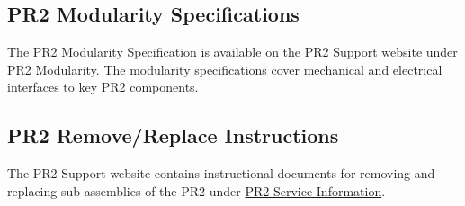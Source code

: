 \subsection{PR2 Modularity Specifications}

The PR2 Modularity Specification is available on the PR2 Support website under \href{http://pr2support.willowgarage.com/wiki/PR2 Modularity}{PR2 Modularity}. The modularity specifications cover mechanical and electrical interfaces to key PR2 components.

\subsection{PR2 Remove/Replace Instructions}

The PR2 Support website contains instructional documents for removing and replacing sub-assemblies of the PR2 under \href{http://pr2support.willowgarage.com/wiki/PR2 Service Information}{PR2 Service Information}.
